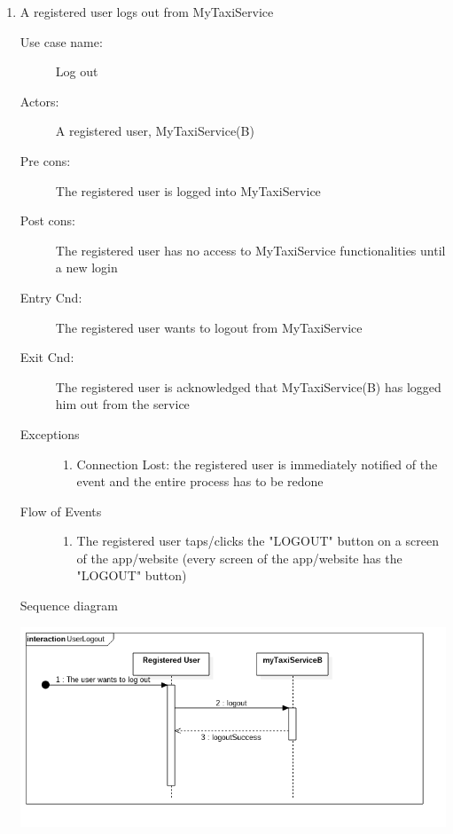 \documentclass[11pt]{article} %
\begin{document}
\begin{enumerate}
	       \item A registered user logs out from MyTaxiService
		\begin{description}
		        \item [Use case name:] Log out
		        \item [Actors:] A registered user, MyTaxiService(B)
		        \item [Pre cons:] The registered user is logged into MyTaxiService
		        \item [Post cons:] The registered user has no access to MyTaxiService functionalities
		        until a new login
		        \item [Entry Cnd:] The registered user wants to logout from MyTaxiService
		        \item [Exit Cnd:] The registered user is acknowledged that MyTaxiService(B) has logged him out from
		        the service
		        \item [Exceptions]\hfill
			\begin{enumerate}
			          \item Connection Lost: the registered user is immediately notified of the event and the entire process
			          has to be redone
			\end{enumerate}
		        \item [Flow of Events]\hfill
			\begin{enumerate}
			          \item The registered user taps/clicks the "LOGOUT" button on a screen of the app/website
			          (every screen of the app/website has the "LOGOUT" button)
			\end{enumerate}
		\end{description}
		\newpage
		Sequence diagram
		\begin{center}
		\includegraphics[scale=0.52]{usecase7.png}
		\end{center}
	

\end{enumerate}
\end{document}
